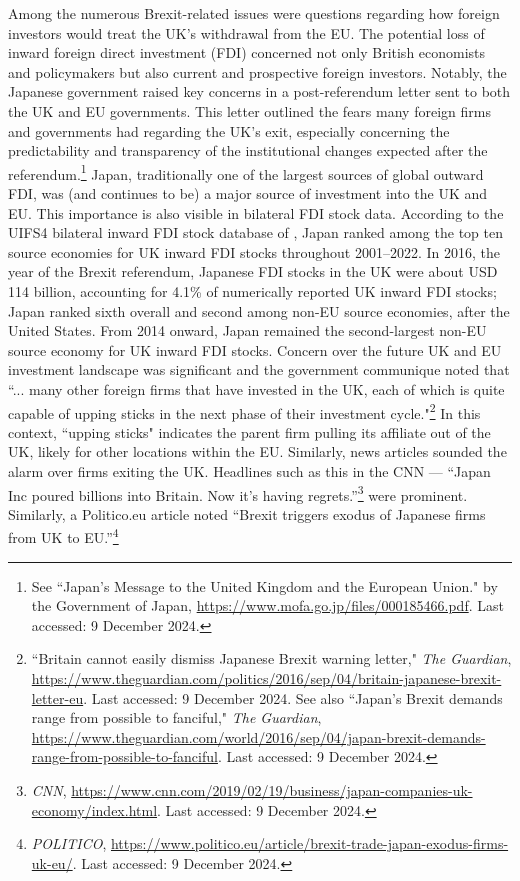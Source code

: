 \documentclass[preprint,11pt,authoryear]{elsarticle}
\begin{document}
Among the numerous Brexit-related issues were questions regarding how foreign investors would treat the UK's withdrawal from the EU. The potential loss of inward foreign direct investment (FDI) concerned not only British economists and policymakers but also current and prospective foreign investors. Notably, the Japanese government raised key concerns in a post-referendum letter sent to both the UK and EU governments. This letter outlined the fears many foreign firms and governments had regarding the UK's exit, especially concerning the predictability and transparency of the institutional changes expected after the referendum.\footnote{See ``Japan’s Message to the United Kingdom and the European Union." by the Government of Japan, \url{https://www.mofa.go.jp/files/000185466.pdf}. Last accessed: 9 December 2024.} Japan, traditionally one of the largest sources of global outward FDI, was (and continues to be) a major source of investment into the UK and EU. This importance is also visible in bilateral FDI stock data. According to the UIFS4 bilateral inward FDI stock database of \citet{kox2025repairing}, Japan ranked among the top ten source economies for UK inward FDI stocks throughout 2001--2022. In 2016, the year of the Brexit referendum, Japanese FDI stocks in the UK were about USD 114 billion, accounting for 4.1\% of numerically reported UK inward FDI stocks; Japan ranked sixth overall and second among non-EU source economies, after the United States. From 2014 onward, Japan remained the second-largest non-EU source economy for UK inward FDI stocks. Concern over the future UK and EU investment landscape was significant and the government communique noted that ``... many other foreign firms that have invested in the UK, each of which is quite capable of upping sticks in the next phase of their investment cycle."\footnote{``Britain cannot easily dismiss Japanese Brexit warning letter," \textit{The Guardian}, \url{https://www.theguardian.com/politics/2016/sep/04/britain-japanese-brexit-letter-eu}.  Last accessed: 9 December 2024. See also ``Japan's Brexit demands range from possible to fanciful,"  \textit{The Guardian}, \url{https://www.theguardian.com/world/2016/sep/04/japan-brexit-demands-range-from-possible-to-fanciful}. Last accessed: 9 December 2024.} In this context, ``upping sticks" indicates the parent firm pulling its affiliate out of the UK, likely for other locations within the EU.  
Similarly, news articles sounded the alarm over firms exiting the UK. 
Headlines such as this in the CNN --- ``Japan Inc poured billions into Britain. Now it's having regrets.''\footnote{\textit{CNN}, \url{https://www.cnn.com/2019/02/19/business/japan-companies-uk-economy/index.html}. Last accessed: 9 December 2024.} were prominent. Similarly, a Politico.eu article noted ``Brexit triggers exodus of Japanese firms from UK to EU.''\footnote{\textit{POLITICO}, \url{https://www.politico.eu/article/brexit-trade-japan-exodus-firms-uk-eu/}. Last accessed: 9 December 2024.}
\end{document}
